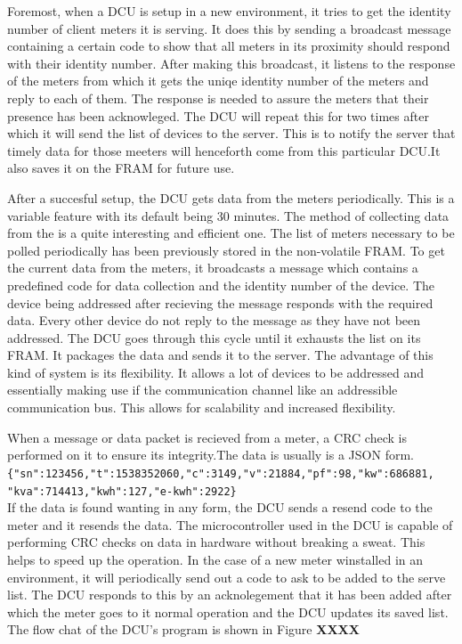 Foremost, when a DCU is setup in a new environment, it tries to get the identity number of client meters it is serving. It does this by sending a broadcast message containing a certain code to show that all meters in its proximity should respond with their identity number. After making this broadcast, it listens to the response of the meters from which it gets the uniqe identity number of the meters and reply to each of them. The response is needed to assure the meters that their presence has been acknowleged. The DCU will repeat this for two times after which it will send the list of devices to the server. This is to notify the server that timely data for those meeters will henceforth come from this particular DCU.It also saves it on the FRAM for future use.

 
After a succesful setup, the DCU gets data from the meters periodically. This is a variable feature with its default being 30 minutes. The method of collecting data from the is a quite interesting and efficient one. The list of meters necessary to be polled periodically has been previously stored in the non-volatile FRAM. To get the current data from the meters, it broadcasts a message which contains a predefined code for data collection and the identity number of the device. The device being addressed after recieving the message responds with the required data. Every other device do not reply to the message as they have not been addressed.  The DCU goes through this cycle until it exhausts the list on its FRAM. It packages the data and sends it to the server. The advantage of this kind of system is its flexibility. It allows a lot of devices to be addressed and essentially making use if the communication channel like an addressible communication bus. This allows for scalability and increased flexibility.

When a message or data packet is recieved from a meter, a CRC check is performed on it to ensure its integrity.The data is usually is a JSON form.\\
 \verb|{"sn":123456,"t":1538352060,"c":3149,"v":21884,"pf":98,"kw":686881,|\\
 \verb|"kva":714413,"kwh":127,"e-kwh":2922}|\\
If the data is found wanting in any form, the DCU sends a resend code to the meter and it resends the data. The microcontroller used in the DCU is capable of performing CRC checks on data in hardware without breaking a sweat. This helps to speed up the operation. In the case of a new meter winstalled in an environment, it will periodically send out a code to ask to be added to the serve list. The DCU  responds to this by an acknolegement that it has been added after which the meter goes to it normal operation and the DCU updates its saved list. The flow chat of the DCU's program is shown in Figure \textbf{XXXX}

